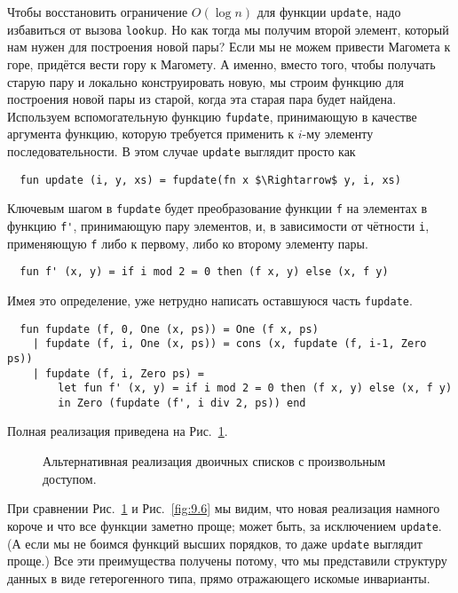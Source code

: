 Чтобы восстановить ограничение $O(\log n)$ для функции
\lstinline!update!, надо избавиться от вызова
\lstinline!lookup!. Но как тогда мы получим второй элемент, который
нам нужен для построения новой пары? Если мы не можем привести
Магомета к горе, придётся вести гору к Магомету. А именно, вместо
того, чтобы получать старую пару и локально конструировать новую, мы
строим функцию для построения новой пары из старой, когда эта старая
пара будет найдена. Используем вспомогательную функцию
\lstinline!fupdate!, принимающую в качестве аргумента функцию, которую
требуется применить к $i$-му элементу последовательности. В этом
случае \lstinline!update! выглядит просто как
\begin{lstlisting}
  fun update (i, y, xs) = fupdate(fn x $\Rightarrow$ y, i, xs)
\end{lstlisting}
Ключевым шагом в \lstinline!fupdate! будет преобразование функции
\lstinline!f! на элементах в функцию \lstinline!f'!, принимающую пару
элементов, и, в зависимости от чётности \lstinline!i!, применяющую
\lstinline!f! либо к первому, либо ко второму элементу пары.
\begin{lstlisting}
  fun f' (x, y) = if i mod 2 = 0 then (f x, y) else (x, f y)
\end{lstlisting}
Имея это определение, уже нетрудно написать оставшуюся часть
\lstinline!fupdate!.
\begin{lstlisting}
  fun fupdate (f, 0, One (x, ps)) = One (f x, ps)
    | fupdate (f, i, One (x, ps)) = cons (x, fupdate (f, i-1, Zero ps))
    | fupdate (f, i, Zero ps) =
        let fun f' (x, y) = if i mod 2 = 0 then (f x, y) else (x, f y)
        in Zero (fupdate (f', i div 2, ps)) end
\end{lstlisting}
Полная реализация приведена на Рис.~\ref{fig:10.1}.

\begin{figure}
  \centering

  \caption{Альтернативная реализация двоичных списков с произвольным доступом.}
  \label{fig:10.1}
\end{figure}

При сравнении Рис.~\ref{fig:10.1} и Рис.~\ref{fig:9.6} мы видим, что
новая реализация намного короче и что все функции заметно проще; может
быть, за исключением \lstinline!update!. (А если мы не боимся функций
высших порядков, то даже \lstinline!update! выглядит проще.) Все эти
преимущества получены потому, что мы представили структуру данных
в виде гетерогенного типа, прямо отражающего искомые инварианты.

